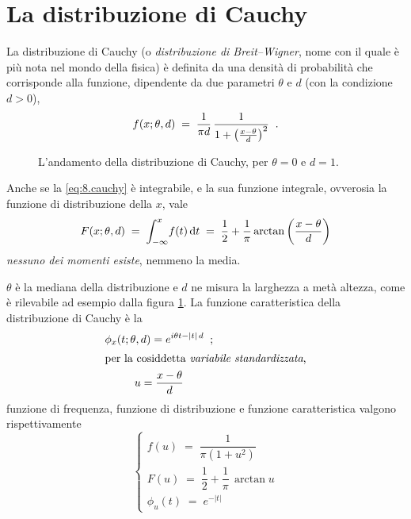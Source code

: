 \section{La distribuzione di Cauchy}%
%
%
\label{ch:8.cauchy}
La distribuzione di Cauchy (o \emph{distribuzione di
  Breit--Wigner}, nome con il quale \`e pi\`u nota nel mondo
della fisica) \`e definita da una densit\`a di probabilit\`a
che corrisponde alla funzione, dipendente da due parametri
$\theta$ e $d$ (con la condizione $d > 0$),
\begin{equation} \label{eq:8.cauchy}
  f(x;\theta, d) \; = \; \frac{1}{\pi d} \, \frac{1}{1
    + \left( \frac{x - \theta}{d} \right)^2} \;\; .
\end{equation}
\begin{figure}[htbp]
  \vspace*{2ex}
  \begin{center} {
    
  } \end{center}
  \caption[La distribuzione di Cauchy]
    {L'andamento della distribuzione di Cauchy,
    per $\theta = 0$ e $d = 1$.}
  \label{fig:8.cauchy}
\end{figure}
Anche se la \eqref{eq:8.cauchy} \`e integrabile, e la sua
funzione integrale, ovverosia la funzione di distribuzione
della $x$, vale
\begin{equation*}
  F(x;\theta, d) \; = \; \int_{-\infty}^x \! f(t) \,
    \mathrm{d} t \; = \; \frac{1}{2} + \frac{1}{\pi} \arctan
    \left( \frac{x - \theta}{d} \right)
\end{equation*}
\emph{nessuno dei momenti esiste}, nemmeno la media.

$\theta$ \`e la mediana della distribuzione e $d$ ne misura
la larghezza a met\`a altezza, come \`e rilevabile ad
esempio dalla figura \ref{fig:8.cauchy}.  La funzione
caratteristica della distribuzione di Cauchy \`e la
\begin{gather*}
  \phi_x (t; \theta, d) = e^{ i \theta t - |t| \, d } \;\; ;
  \\
  \intertext{per la cosiddetta \emph{variabile
      standardizzata},}
  u = \frac{ x - \theta }{ d }
\end{gather*}
funzione di frequenza, funzione di distribuzione e funzione
caratteristica valgono rispettivamente
\begin{equation*}
  \begin{cases}
    f(u) \; = \; \dfrac{ 1 }{ \pi \left( 1 + u^2 \right) }
    \\[3ex]
    F(u) \; = \; \dfrac{1}{2} + \dfrac{1}{\pi} \, \arctan u
    \\[3ex]
    \phi_u (t) \; = \; \displaystyle e^{ - |t| }
  \end{cases}
\end{equation*}

